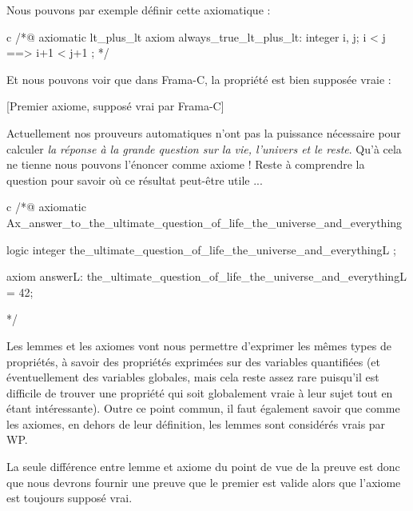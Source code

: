 \documentclass[middle]{zmdocument}
\begin{document}
Nous pouvons par exemple définir cette axiomatique :



\begin{CodeBlock}{c}
/*@
  axiomatic lt_plus_lt{
    axiom always_true_lt_plus_lt:
      \forall integer i, j; i < j ==> i+1 < j+1 ;
  }
*/
\end{CodeBlock}



Et nous pouvons voir que dans Frama-C, la propriété est bien supposée vraie :



[Premier axiome, supposé vrai par Frama-C]


\begin{Spoiler}
Actuellement nos prouveurs automatiques n'ont pas la puissance nécessaire
pour calculer \textit{la réponse à la grande question sur la vie, l'univers et le 
reste}. Qu'à cela ne tienne nous pouvons l'énoncer comme axiome ! Reste à
comprendre la question pour savoir où ce résultat peut-être utile ...

\begin{CodeBlock}{c}
/*@
  axiomatic Ax_answer_to_the_ultimate_question_of_life_the_universe_and_everything {
    logic integer the_ultimate_question_of_life_the_universe_and_everything{L} ;

    axiom answer{L}:
      the_ultimate_question_of_life_the_universe_and_everything{L} = 42;
  }
*/
\end{CodeBlock}
\end{Spoiler}




Les lemmes et les axiomes vont nous permettre d'exprimer les mêmes types de 
propriétés, à savoir des propriétés exprimées sur des variables quantifiées (et
éventuellement des variables globales, mais cela reste assez rare puisqu'il est
difficile de trouver une propriété qui soit globalement vraie à leur sujet tout
en étant intéressante). Outre ce point commun, il faut également savoir que 
comme les axiomes, en dehors de leur définition, les lemmes sont considérés 
vrais par WP.



La seule différence entre lemme et axiome du point de vue de la preuve est donc
que nous devrons fournir une preuve que le premier est valide alors que l'axiome
est toujours supposé vrai.



\end{document}
